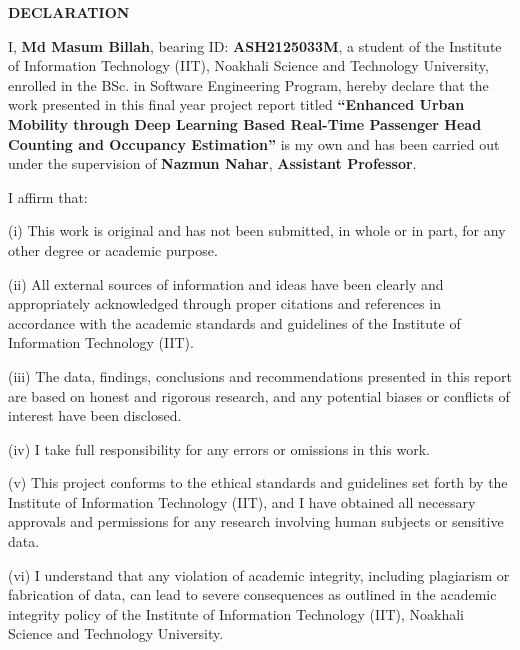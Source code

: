 
\begin{center}
	{\Large\bfseries DECLARATION}
\end{center}

I, \textbf{Md Masum Billah}, bearing ID: \textbf{ASH2125033M}, a student of the Institute of Information Technology (IIT), Noakhali Science and Technology University, enrolled in the BSc. in Software Engineering Program, hereby declare that the work presented in this final year project report titled \textbf{``Enhanced Urban Mobility through Deep Learning Based Real-Time Passenger Head Counting and Occupancy Estimation''} is my own and has been carried out under the supervision of \textbf{Nazmun Nahar}, \textbf{Assistant Professor}.
	
\vspace{0.2cm}
	
I affirm that:
	
\noindent
\hangindent=0.8cm
(i) This work is original and has not been submitted, in whole or in part, for any other degree or academic purpose.

\noindent
\hangindent=0.8cm
(ii) All external sources of information and ideas have been clearly and appropriately acknowledged through proper citations and references in accordance with the academic standards and guidelines of the Institute of Information Technology (IIT).
		
\noindent
\hangindent=0.8cm
(iii) The data, findings, conclusions and recommendations presented in this report are based on honest and rigorous research, and any potential biases or conflicts of interest have been disclosed.
		
\noindent
\hangindent=0.8cm
(iv) I take full responsibility for any errors or omissions in this work.
		
\noindent
\hangindent=0.8cm
(v) This project conforms to the ethical standards and guidelines set forth by the Institute of Information Technology (IIT), and I have obtained all necessary approvals and permissions for any research involving human subjects or sensitive data.
		
\noindent
\hangindent=0.8cm
(vi) I understand that any violation of academic integrity, including plagiarism or fabrication of data, can lead to severe consequences as outlined in the academic integrity policy of the Institute of Information Technology (IIT), Noakhali Science and Technology University.
	
